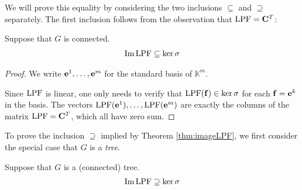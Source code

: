 \documentclass[main.tex]{subfiles}
\begin{document}
We will prove this equality by considering the two inclusions $\subseteq$ and $\supseteq$ separately. The first inclusion follows from the observation that $\text{\textup{LPF}} = \mathbf{C}^T$:
\begin{lemma}\label{lem:imlpfsubsetkersigma}
Suppose that $G$ is connected. 
\begin{gather}
\operatorname{Im} \text{\textup{LPF}} \subseteq \ker \sigma\label{eq:LPFfin}
\end{gather}
\end{lemma}
\begin{proof}
We write $\mathbf{e}^1, \dots, \mathbf{e}^m$ for the standard basis of $\mathbb{K}^m$.

Since $\text{\textup{LPF}}$ is linear, one only needs to verify that $\text{\textup{LPF}}(\mathbf{f}) \in \ker \sigma$ for each $\mathbf{f}=\mathbf{e}^k$ in the basis.
The vectors $\text{\textup{LPF}}(\mathbf{e}^1), \dots, \text{\textup{LPF}}(\mathbf{e}^m)$ are exactly the columns of the matrix $\text{\textup{LPF}} = \mathbf{C}^T$, which all have zero sum. 
\end{proof}

To prove the inclusion $\supseteq$ implied by Theorem \ref{thm:imageLPF}, we first consider the special case that $G$ is a \emph{tree}.

\begin{lemma}\label{lem:connectedtree}
Suppose that $G$ is a (connected) tree.
\begin{gather}
\operatorname{Im} \text{\textup{LPF}} \supseteq \ker \sigma
\end{gather}
\end{lemma}
\end{document}
